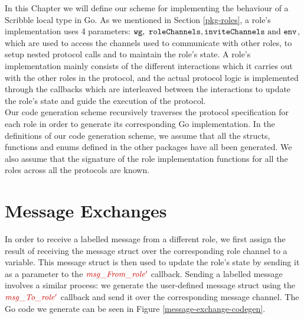 \documentclass[12pt,twoside]{report}
\begin{document}
In this Chapter we will define our scheme for implementing the behaviour of a Scribble local type in Go. As we mentioned in Section \ref{pkg-roles}, a role's implementation uses 4 parameters: $\varname{wg},\ \varname{roleChannels}, \varname{inviteChannels}\ \text{and}\ \varname{env}$, which are used to access the channels used to communicate with other roles, to setup nested protocol calls and to maintain the role's state. A role's implementation mainly consists of the different interactions which it carries out with the other roles in the protocol, and the actual protocol logic is implemented through the callbacks which are interleaved between the interactions to update the role's state and guide the execution of the protocol.\\

Our code generation scheme recursively traverses the protocol specification for each role in order to generate its corresponding Go implementation. In the definitions of our code generation scheme, we assume that all the structs, functions and enums defined in the other packages have all been generated. We also assume that the signature of the role implementation functions for all the roles across all the protocols are known. 

\section{Message Exchanges}\label{msg-exchanges-impl}

In order to receive a labelled message from a different role, we first assign the result of receiving the message struct over the corresponding role channel to a variable. This message struct is then used to update the role's state by sending it as a parameter to the $\functionname{msg\_From\_role'}$ callback. Sending a labelled message involves a similar process: we generate the user-defined message struct using the $\functionname{msg\_To\_role'}$ callback and send it over the corresponding message channel. The Go code we generate can be seen in Figure \ref{message-exchange-codegen}.

\clearpage
\end{document}
